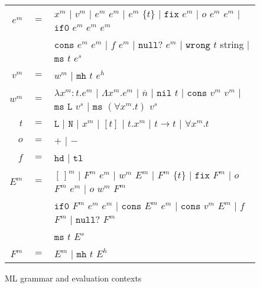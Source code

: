 \begin{figure}[p]
\centering
\begin{tabular}{rcl}

$e^m$ & $=$ & $x^m$ $|$ $v^m$ $|$ $e^m$ $e^m$ $|$ $e^m$ $\lbrace t\rbrace$ $|$ $\mathtt{fix}$ $e^m$ $|$ $o$ $e^m$ $e^m$ $|$ $\mathtt{if0}$ $e^m$ $e^m$ $e^m$ \\

&& $\mathtt{cons}$ $e^m$ $e^m$ $|$ $f$ $e^m$ $|$ $\mathtt{null?}$ $e^m$ $|$ $\mathtt{wrong}$ $t$ string $|$ $\mathtt{ms}$ $t$ $e^s$ \\

$v^m$ & $=$ & $w^m$ $|$ $\mathtt{mh}$ $t$ $e^h$ \\

$w^m$ & $=$ & $\lambda x^m:t.e^m$ $|$ $\Lambda x^m.e^m$ $|$ $\overline{n}$ $|$ $\mathtt{nil}$ $t$ $|$ $\mathtt{cons}$ $v^m$ $v^m$ $|$ $\mathtt{ms}$ $\mathtt{L}$ $v^s$ $|$ $\mathtt{ms}$ $(\forall x^m.t)$ $v^s$ \\

$t$ & $=$ & $\mathtt{L}$ $|$ $\mathtt{N}$ $|$ $x^m$ $|$ $[t]$ $|$ $t.x^m$ $|$ $t\rightarrow t$ $|$ $\forall x^m.t$ \\

$o$ & $=$ & $+$ $|$ $-$ \\

$f$ & $=$ & $\mathtt{hd}$ $|$ $\mathtt{tl}$ \\

$E^m$ & $=$ & $[\,]^m$ $|$ $F^m$ $e^m$ $|$ $w^m$ $E^m$ $|$ $F^m$ $\lbrace t\rbrace$ $|$ $\mathtt{fix}$ $F^m$ $|$ $o$ $F^m$ $e^m$ $|$ $o$ $w^m$ $F^m$ \\

&& $\mathtt{if0}$ $F^m$ $e^m$ $e^m$ $|$ $\mathtt{cons}$ $E^m$ $e^m$ $|$ $\mathtt{cons}$ $v^m$ $E^m$ $|$ $f$ $F^m$ $|$ $\mathtt{null?}$ $F^m$ \\

&& $\mathtt{ms}$ $t$ $E^s$ \\

$F^m$ & $=$ & $E^m$ $|$ $\mathtt{mh}$ $t$ $E^h$

\end{tabular}
\caption{ML grammar and evaluation contexts}
\label{mg}
\end{figure}